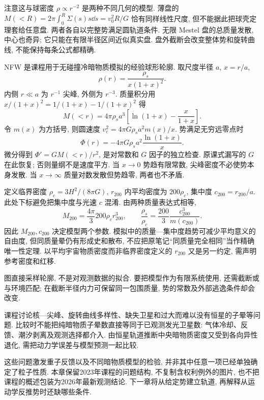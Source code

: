 注意这与球密度 $\rho\propto r^{-2}$ 是两种不同几何的模型. 薄盘的 $M(<R)=2\pi\int_0^R\Sigma(s)s\dd s=v_0^2R/G$ 恰有同样线性尺度, 但不能据此把球壳定理套给任意盘. 两者各自以完整势满足圆轨道条件. 无限 Mestel 盘的总质量发散, 中心也奇异; 它只能在有限半径区间近似真实盘. 盘外截断会改变整体势和旋转曲线, 不能保持每条公式都精确.

NFW 是课程用于无碰撞冷暗物质模拟的经验球形轮廓. 取尺度半径 $a$, $x=r/a$,
\[
\rho(r)=\frac{\rho_s}{x(1+x)^2}.
\]
内侧 $r\ll a$ 为 $r^{-1}$ 尖峰, 外侧为 $r^{-3}$. 质量积分用 $x/(1+x)^2=1/(1+x)-1/(1+x)^2$ 得
\[
M(<r)=4\pi\rho_sa^3\left[\ln(1+x)-\frac{x}{1+x}\right].
\]
令 $m(x)$ 为方括号, 则圆速度 $v_c^2=4\pi G\rho_sa^2m(x)/x$. 势满足无穷远零点时
\[
\Phi(r)=-4\pi G\rho_sa^2\frac{\ln(1+x)}x.
\]
微分得到 $\Phi'=GM(<r)/r^2$, 是对常数和 $G$ 因子的独立检查. 原课式漏写的 $G$ 在此恢复; 否则量纲不是速度平方. 当 $x\to0$ 势趋有限常数, 尖峰密度不必使势本身发散. 当 $x\to\infty$ 质量对数发散但势趋零, 两者也不矛盾.

定义临界密度 $\rho_c=3H^2/(8\pi G)$, $r_{200}$ 内平均密度为 $200\rho_c$, 集中度 $c_{200}=r_{200}/a$. 此处下标避免把集中度与光速 $c$ 混淆. 由两种质量表达式相等,
\[
M_{200}=\frac{4\pi}{3}200\rho_cr_{200}^3,
\qquad
\frac{\rho_s}{\rho_c}=\frac{200}{3}\frac{c_{200}^3}{m(c_{200})}.
\]
因此 $M_{200},c_{200}$ 决定模型两个参数. 模拟中的质量—集中度趋势可减少平均意义的自由度, 但同质量晕仍有形成史和散布, 不应把原笔记“同质量完全相同”当作精确唯一性定理. 以平均宇宙物质密度而非临界密度定义的 $r_{200}$ 又是另一约定, 需声明参考密度和红移.

\begin{center}
\end{center}
图直接采样轮廓, 不是对观测数据的拟合. 要把模型作为有限系统使用, 还需截断或与环境匹配; 在截断半径内力可保留同一包围质量, 势的常数及外部逃逸条件却会改变.

课程讨论核—尖峰、旋转曲线多样性、缺失卫星和过大而难以没有恒星的子晕等问题. 比较时不能把纯暗物质子晕数直接等同于已观测发光卫星数: 气体冷却、反馈、潮汐剥离及观测选择都介入. 由恒星轨道推断中央暗物质密度又受到各向异性退化, 需把动力学误差与模型预测一起比较.

这些问题激发重子反馈以及不同暗物质模型的检验, 并非其中任意一项已经单独确定了粒子性质. 本章保留2023年课程的问题结构, 不复制含权利例外的图片, 也不把课程的概述包装为2026年最新观测结论. 下一章将从给定势建立轨道, 再解释从运动学反推势时还缺哪些条件.
